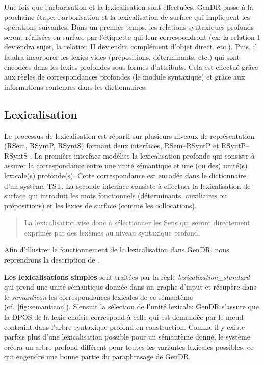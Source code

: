 Une fois que l'arborisation et la lexicalisation sont effectuées, GenDR passe à la prochaine étape: l'arborisation et la lexicalisation de surface qui impliquent les opérations suivantes. Dans un premier temps, les relations syntaxiques profonds seront réalisées en surface par l'étiquette qui leur correspondront (ex: la relation I deviendra sujet, la relation II deviendra complément d'objet direct, etc.). Puis, il faudra incorporer les lexies vides (prépositions, déterminants, etc.) qui sont encodées dans les lexies profondes sous formes d'attributs. Cela est effectué grâce aux règles de correspondances profondes (le module syntaxique) et grâce aux informations contenues dans les dictionnaires.


\subsection{Lexicalisation}

Le processus de lexicalisation est réparti sur plusieurs niveaux de représentation (\ac{RSem}, \ac{RSyntP}, \ac{RSyntS}) formant deux interfaces, \ac{RSem}--\ac{RSyntP} et \ac{RSyntP}--\ac{RSyntS} \citep{PolguerePourmodelestratifie}. La première interface modélise la lexicalisation profonde qui consiste à assurer la correspondance entre une unité sémantique et une (ou des) unité(s) lexicale(s) profonde(s). Cette correspondance est encodée dans le dictionnaire d'un système \ac{TST}. La seconde interface consiste à effectuer la lexicalisation de surface qui introduit les mots fonctionnels (déterminants, auxiliaires ou prépositions) et les lexies de surface (comme les collocations).

\begin{quote}
La lexicalisation vise donc à sélectionner les Sens qui seront directement exprimés par des lexèmes au niveau syntaxique profond.
\end{quote}
\vspace{-\baselineskip}
\hfill
\cite[p.~154]{PolguereStructurationmisejeu1990}

Afin d'illustrer le fonctionnement de la lexicalisation dans GenDR, nous reprendrons la description de \cite{lareau18}.

\textbf{Les lexicalisations simples}
sont traitées par la règle \emph{lexicalization\_standard} qui prend une unité sémantique donnée dans un graphe d'input et récupère dans le \emph{semanticon} les correspondances lexicales de ce sémantème (cf.~\ref{fig:semanticon}). S'ensuit la sélection de l'unité lexicale: GenDR s'assure que la \ac{DPOS} de la lexie choisie correspond à celle qui est demandée par le n\oe{}ud contraint dans l'arbre syntaxique profond en construction. Comme il y existe parfois plus d'une lexicalisation possible pour un sémantème donné, le système créera un arbre profond différent pour toutes les variantes lexicales possibles, ce qui engendre une bonne partie du paraphrasage de GenDR.

